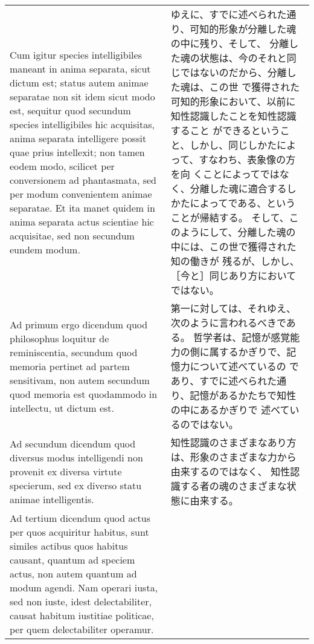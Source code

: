 \documentclass[10pt]{jsarticle} %
\begin{document}
\begin{longtable}{p{21em}p{21em}}
\\



Cum igitur species intelligibiles
 maneant in anima separata, sicut dictum est; status autem animae
 separatae non sit idem sicut modo est, sequitur quod secundum species
 intelligibiles hic acquisitas, anima separata intelligere possit quae
 prius intellexit; non tamen eodem modo, scilicet per conversionem ad
 phantasmata, sed per modum convenientem animae separatae. Et ita manet
 quidem in anima separata actus scientiae hic acquisitae, sed non
 secundum eundem modum.


&

ゆえに、すでに述べられた通り、可知的形象が分離した魂の中に残り、そして、
 分離した魂の状態は、今のそれと同じではないのだから、分離した魂は、この世
 で獲得された可知的形象において、以前に知性認識したことを知性認識すること
 ができるということ、しかし、同じしかたによって、すなわち、表象像の方を向
 くことによってではなく、分離した魂に適合するしかたによってである、という
 ことが帰結する。
そして、このようにして、分離した魂の中には、この世で獲得された知の働きが
 残るが、しかし、［今と］同じあり方においてではない。

\\



{\sc Ad primum ergo dicendum} quod philosophus
 loquitur de reminiscentia, secundum quod memoria pertinet ad partem
 sensitivam, non autem secundum quod memoria est quodammodo in
 intellectu, ut dictum est.

&
第一に対しては、それゆえ、次のように言われるべきである。
哲学者は、記憶が感覚能力の側に属するかぎりで、記憶力について述べているの
 であり、すでに述べられた通り、記憶があるかたちで知性の中にあるかぎりで
 述べているのではない。


\\


{\sc Ad secundum dicendum} quod diversus modus
 intelligendi non provenit ex diversa virtute specierum, sed ex diverso
 statu animae intelligentis.

&

知性認識のさまざまなあり方は、形象のさまざまな力から由来するのではなく、
 知性認識する者の魂のさまざまな状態に由来する。

\\



{\sc Ad tertium dicendum} quod actus per quos
 acquiritur habitus, sunt similes actibus quos habitus causant, quantum
 ad speciem actus, non autem quantum ad modum agendi. Nam operari iusta,
 sed non iuste, idest delectabiliter, causat habitum iustitiae
 politicae, per quem delectabiliter operamur.


\end{longtable}
\end{document}

